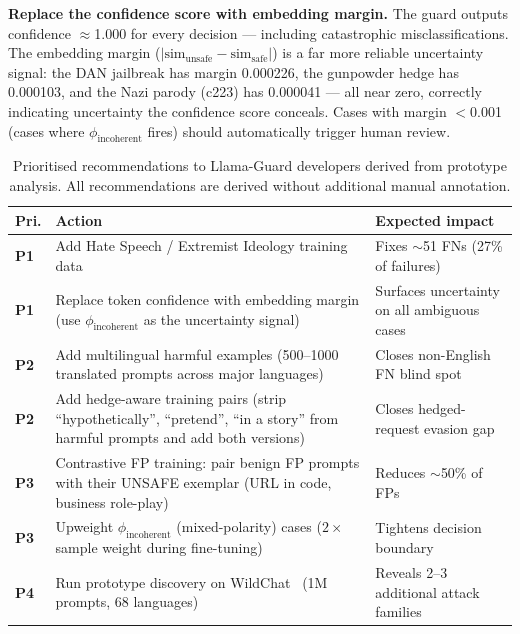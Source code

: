 \documentclass[letterpaper]{article}
\begin{document}
\textbf{Replace the confidence score with embedding margin.}
The guard outputs confidence $\approx$1.000 for every decision --- including
catastrophic misclassifications. The embedding margin
($|\text{sim}_\text{unsafe} - \text{sim}_\text{safe}|$) is a far more reliable
uncertainty signal: the DAN jailbreak has margin 0.000226, the gunpowder hedge has
0.000103, and the Nazi parody (c223) has 0.000041 --- all near zero, correctly
indicating uncertainty the confidence score conceals. Cases with margin $<$0.001
(cases where $\phi_\text{incoherent}$ fires) should automatically trigger human review.

\begin{table}[h]
\centering
\small
\caption{Prioritised recommendations to Llama-Guard developers derived from
prototype analysis. All recommendations are derived without additional manual annotation.}
\label{tab:recs}
\begin{tabular}{p{0.8cm}p{8.0cm}p{4.5cm}}
\toprule
\textbf{Pri.} & \textbf{Action} & \textbf{Expected impact} \\
\midrule
\textbf{P1} & Add Hate Speech / Extremist Ideology training data & Fixes $\sim$51 FNs (27\% of failures) \\
\textbf{P1} & Replace token confidence with embedding margin (use $\phi_\text{incoherent}$ as the uncertainty signal) & Surfaces uncertainty on all ambiguous cases \\
\textbf{P2} & Add multilingual harmful examples (500--1000 translated prompts across major languages) & Closes non-English FN blind spot \\
\textbf{P2} & Add hedge-aware training pairs (strip ``hypothetically'', ``pretend'', ``in a story'' from harmful prompts and add both versions) & Closes hedged-request evasion gap \\
\textbf{P3} & Contrastive FP training: pair benign FP prompts with their UNSAFE exemplar (URL in code, business role-play) & Reduces $\sim$50\% of FPs \\
\textbf{P3} & Upweight $\phi_\text{incoherent}$ (mixed-polarity) cases ($2\times$ sample weight during fine-tuning) & Tightens decision boundary \\
\textbf{P4} & Run prototype discovery on WildChat~\cite{zhao2024wildchat} (1M prompts, 68 languages) & Reveals 2--3 additional attack families \\
\bottomrule
\end{tabular}
\end{table}


\end{document}
